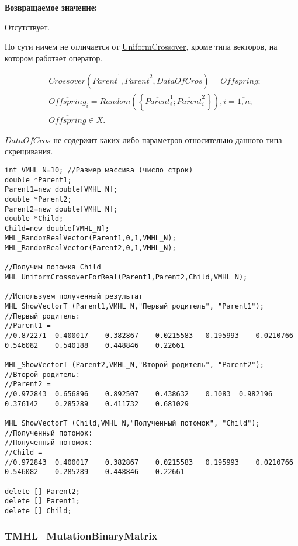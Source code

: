 \documentclass[a4paper,12pt]{article}
\begin{document}
\textbf{Возвращаемое значение:}

 Отсутствует.
 
По сути ничем не отличается от \hyperref[SetOfOperatorsAlgorithms:UniformCrossover]{UniformCrossover}, кроме типа векторов, на котором работает оператор.
 
\begin{align*}
&Crossover \left( \overline{Parent}^1, \overline{Parent}^2, DataOfCros\right) = \overline{Offspring};\\
& \overline{Offspring}_i=Random\left( \left\lbrace \overline{Parent}^1_i;\overline{Parent}^2_i\right\rbrace \right), i=\overline{1,n} ;\nonumber\\
&\overline{Offspring}\in X.\nonumber
\end{align*}

$ DataOfCros $ не содержит каких-либо параметров относительно данного типа скрещивания.


\begin{lstlisting}[label=code_use_MHL_UniformCrossoverForReal,caption=Пример использования]
int VMHL_N=10; //Размер массива (число строк)
double *Parent1;
Parent1=new double[VMHL_N];
double *Parent2;
Parent2=new double[VMHL_N];
double *Child;
Child=new double[VMHL_N];
MHL_RandomRealVector(Parent1,0,1,VMHL_N);
MHL_RandomRealVector(Parent2,0,1,VMHL_N);

//Получим потомка Child
MHL_UniformCrossoverForReal(Parent1,Parent2,Child,VMHL_N);

//Используем полученный результат
MHL_ShowVectorT (Parent1,VMHL_N,"Первый родитель", "Parent1");
//Первый родитель:
//Parent1 =
//0.872271	0.400017	0.382867	0.0215583	0.195993	0.0210766	0.546082	0.540188	0.448846	0.22661

MHL_ShowVectorT (Parent2,VMHL_N,"Второй родитель", "Parent2");
//Второй родитель:
//Parent2 =
//0.972843	0.656896	0.892507	0.438632	0.1083	0.982196	0.376142	0.285289	0.411732	0.681029

MHL_ShowVectorT (Child,VMHL_N,"Полученный потомок", "Child");
//Полученный потомок:
//Полученный потомок:
//Child =
//0.972843	0.400017	0.382867	0.0215583	0.195993	0.0210766	0.546082	0.285289	0.448846	0.22661

delete [] Parent2;
delete [] Parent1;
delete [] Child;
\end{lstlisting}

\subsubsection{TMHL\_MutationBinaryMatrix}\label{TMHL_MutationBinaryMatrix}
\end{document}
